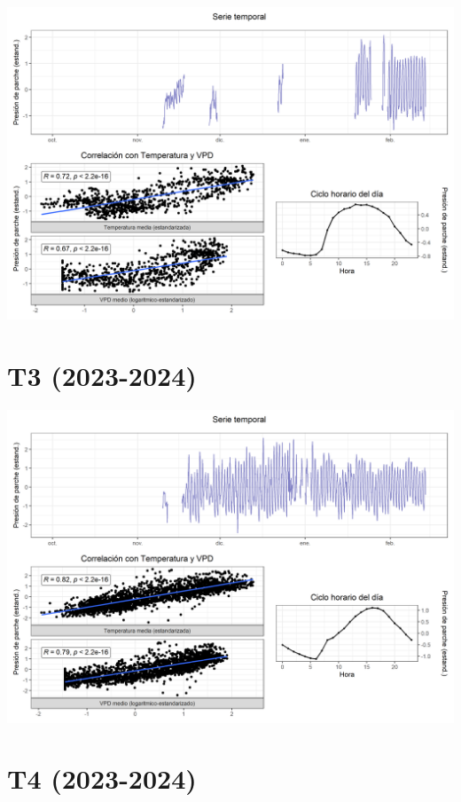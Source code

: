\documentclass[
  letterpaper,
  DIV=11,
  numbers=noendperiod]{scrreprt}
\begin{document}
\includegraphics{figuras/05_turgor_tratamiento/2023_2024_Rio_Claro_T2.png}

\chapter{T3 (2023-2024)}

\includegraphics{figuras/05_turgor_tratamiento/2023_2024_Rio_Claro_T3.png}

\chapter{T4 (2023-2024)}
\end{document}
